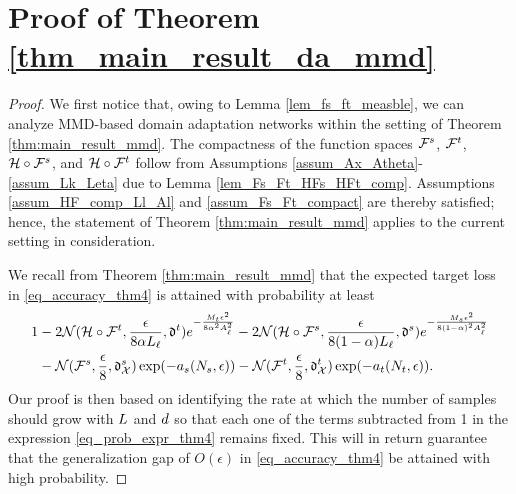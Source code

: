 \documentclass[review,supplement,onefignum,onetabnum]{siamonline250211}
\begin{document}


\section{Proof of Theorem \ref{thm_main_result_da_mmd}}
\label{pf_thm_main_result_da_mmd}


\begin{proof}
We first notice that, owing to Lemma \ref{lem_fs_ft_measble}, we can analyze MMD-based domain adaptation networks within the setting of Theorem \ref{thm:main_result_mmd}. The compactness of the function spaces $\mathcal{F}^s$, $\mathcal{F}^t$, $\mathcal{H} \circ \mathcal{F}^s$, and $\mathcal{H} \circ \mathcal{F}^t$ follow from Assumptions \ref{assum_Ax_Atheta}-\ref{assum_Lk_Leta} due to Lemma \ref{lem_Fs_Ft_HFs_HFt_comp}. Assumptions \ref{assum_HF_comp_Ll_Al} and \ref{assum_Fs_Ft_compact} are thereby satisfied; hence, the statement of Theorem \ref{thm:main_result_mmd} applies to the current setting in consideration.

We recall from Theorem \ref{thm:main_result_mmd} that the expected target loss in \eqref{eq_accuracy_thm4} is attained with probability at least
%
\begin{equation}
\label{eq_prob_expr_thm4}
\begin{split}
1 &- 2 \mathcal{N}( \mathcal{H} \circ \mathcal{F}^t, \frac{\epsilon}{8 \alpha L_\ell}, \mathfrak{d}^t) e^{-\frac{M_t \epsilon^2}{8 \alpha^2 A_\ell^2}} 
-2 \mathcal{N}( \mathcal{H} \circ \mathcal{F}^s, \frac{\epsilon}{8 (1-\alpha) L_\ell}, \mathfrak{d}^s) e^{-\frac{M_s \epsilon^2}{8 (1-\alpha)^2 A_\ell^2}} \\
& - \mathcal{N}(\mathcal{F}^s, \frac{\epsilon}{8}, \mathfrak{d}^s_{\mathcal{X}} ) \exp(-a_s(N_s, \epsilon)) 
- \mathcal{N}(\mathcal{F}^t, \frac{\epsilon}{8}, \mathfrak{d}^t_{\mathcal{X}} ) \exp(-a_t(N_t, \epsilon)).
\end{split}
\end{equation}
%
Our proof is then based on identifying the rate at which the number of samples should grow with $L$ and ${d}$ so that each one of the terms subtracted from 1 in the expression \eqref{eq_prob_expr_thm4} remains fixed. This will in return guarantee that the generalization gap of $O(\epsilon)$ in \eqref{eq_accuracy_thm4} be attained with high probability.
 

\end{proof}
\end{document}
